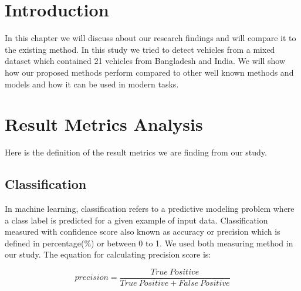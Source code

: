 
\section{Introduction}

In this chapter we will discuss about our research findings and will compare it to the existing method. In this study we tried to detect vehicles from a mixed dataset which contained 21 vehicles from Bangladesh and India. We will show how our proposed methods perform compared to other well known methods and models and how it can be used in modern tasks.

\section{Result Metrics Analysis}
Here is the definition of the result metrics we are finding from our study.
\subsection{Classification} 
In machine learning, classification refers to a predictive modeling problem where a class label is predicted for a given example of input data. 
Classification measured with confidence score  also known as accuracy or precision which is defined in percentage(\%) or between 0 to 1. We used both measuring method in our study. The equation for calculating precision score is:

\begin{equation}
    precision = \frac{True \ Positive}{True \ Positive+False \ Positive}
\end{equation}

